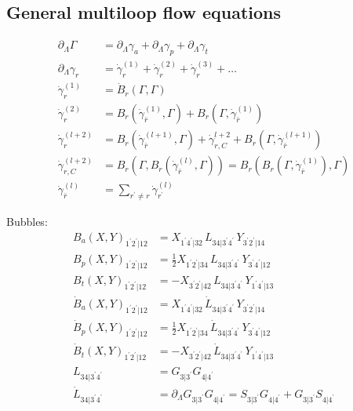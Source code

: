 \documentclass[10pt]{scrartcl}
\begin{document}
\subsection*{General multiloop flow equations}

\begin{align}
\partial_\Lambda \Gamma &= \partial_\Lambda \gamma_a + \partial_\Lambda \gamma_p + \partial_\Lambda \gamma_t
\\
\partial_\Lambda \gamma_r &= \dot{\gamma}_r^{(1)} + \dot{\gamma}_r^{(2)} + \dot{\gamma}_r^{(3)} + \hdots
\\
\dot{\gamma}_r^{(1)} &= \dot{B}_r(\Gamma, \Gamma)
\\
\dot{\gamma}_r^{(2)} &= B_r(\dot{\gamma}_{\bar{r}}^{(1)}, \Gamma) + B_r(\Gamma, \dot{\gamma}_{\bar{r}}^{(1)})
\\
\dot{\gamma}_r^{(l+2)} &= B_r(\dot{\gamma}_{\bar{r}}^{(l+1)}, \Gamma) + \dot{\gamma}_{r,C}^{l+2} + B_r(\Gamma, \dot{\gamma}_{\bar{r}}^{(l+1)})
\\
\dot{\gamma}_{r,C}^{(l+2)} & = B_r(\Gamma, B_r(\dot{\gamma}_{\bar{r}}^{(l)}, \Gamma)) = B_r(B_r(\Gamma, \dot{\gamma}_{\bar{r}}^{(1)}), \Gamma)
\\
\dot{\gamma}_{\bar{r}}^{(l)} &= \sum_{r^\prime \neq r} \dot{\gamma}_{r^\prime}^{(l)}
\end{align}

Bubbles:
\begin{align}
B_a(X, Y)_{1^\prime 2^\prime | 1 2} &= X_{1^\prime 4^\prime | 3 2}\, L_{3 4 | 3^\prime 4^\prime}\, Y_{3^\prime 2^\prime | 1 4}
\\
B_p(X, Y)_{1^\prime 2^\prime | 1 2} &= \tfrac12 X_{1^\prime 2^\prime | 3 4}\, L_{3 4 | 3^\prime 4^\prime}\, Y_{3^\prime 4^\prime | 1 2}
\\
B_t(X, Y)_{1^\prime 2^\prime | 1 2} &= - X_{3^\prime 2^\prime | 4 2}\, L_{3 4 | 3^\prime 4^\prime}\, Y_{1^\prime 4^\prime | 1 3}
\\
\dot{B}_a(X, Y)_{1^\prime 2^\prime | 1 2} &= X_{1^\prime 4^\prime | 3 2}\, \dot{L}_{3 4 | 3^\prime 4^\prime}\, Y_{3^\prime 2^\prime | 1 4}
\\
\dot{B}_p(X, Y)_{1^\prime 2^\prime | 1 2} &= \tfrac12 X_{1^\prime 2^\prime | 3 4}\, \dot{L}_{3 4 | 3^\prime 4^\prime}\, Y_{3^\prime 4^\prime | 1 2}
\\
\dot{B}_t(X, Y)_{1^\prime 2^\prime | 1 2} &= - X_{3^\prime 2^\prime | 4 2}\, \dot{L}_{3 4 | 3^\prime 4^\prime}\, Y_{1^\prime 4^\prime | 1 3}
\\
L_{3 4 | 3^\prime 4^\prime} &= G_{3 | 3^\prime} G_{4 | 4^\prime}
\\
\dot{L}_{3 4 | 3^\prime 4^\prime} &= \partial_\Lambda G_{3 | 3^\prime} G_{4 | 4^\prime}
= S_{3 | 3^\prime} G_{4 | 4^\prime} + G_{3 | 3^\prime} S_{4 | 4^\prime}
\end{align}
\end{document}
